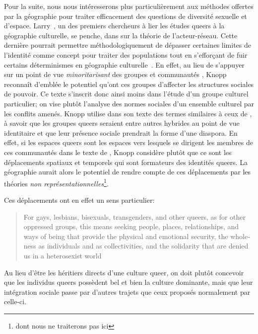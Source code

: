 Pour la suite, nous nous intéresserons plus particulièrement aux méthodes offertes par la géographie pour traiter efficacement des questions de diversité sexuelle et d'espace. 
Larry~\citet{Knopp2004}, un des premiers chercheurs à lier les études queers à la géographie culturelle, se penche, dans  sur la théorie de l'acteur-réseau. 
Cette dernière pourrait permettre méthodologiquement de dépasser certaines limites de l'identité comme concept pour traiter des populations \lgbt{} tout en s’efforçant de fuir certains déterminismes en géographie culturelle~\citep{Knopp2004}. 
En effet, au lieu de s'appuyer sur un point de vue \emph{minoritarisant} des groupes et communautés \lgbt{}, Knopp reconnaît d'emblée le potentiel qu'ont ces groupes d'affecter les structures sociales de pouvoir. 
Ce texte s'inscrit donc ainsi moins dans l'étude d'un groupe culturel particulier; on vise plutôt l'analyse des normes sociales d'un ensemble culturel par les conflits amenés. 
Knopp utilise dans son texte des termes similaires à ceux de \citet{Sinfield1996}, à savoir que les groupes queers seraient entre autres hybrides au point de vue identitaire et que leur présence sociale prendrait la forme d'une diaspora. 
En effet, si les espaces queers sont les espaces vers lesquels se dirigent les membres de ces communautés dans le texte de \citet{Sinfield1996}, Knopp considère plutôt que ce sont les déplacements spatiaux et temporels qui sont formateurs des identités queers.
La géographie aurait alors le potentiel de rendre compte de ces déplacements par les théories \emph{non représentationnelles}\footnote{dont nous ne traiterons pas ici}.

Ces déplacements ont en effet un sens particulier: \foreignblockquote{english}[{\cite[123]{Knopp2004}}][.]{For gays, lesbians, bisexuals, transgenders, and other queers, as for other oppressed groups, this means seeking people, places, relationships, and ways of being that provide the physical and emotional security, the wholeness as individuals and as collectivities, and the solidarity that are denied us in a heterosexist world}
Au lieu d'être les héritiers directs d'une culture queer{}, on doit plutôt concevoir que les individus queers{} possèdent bel et bien la culture dominante, mais que leur intégration sociale passe par d'autres trajets que ceux proposés normalement par celle-ci.

